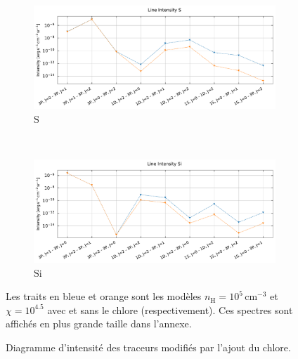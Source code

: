\begin{figure}[!h]
    \begin{subfigure}[t]{0.49\textwidth} %
        \centering \includegraphics[trim = {0 0 0 1cm},clip,width=1\textwidth]{figure/Cl/gridModelEmiss/I_comp_S.pdf}
        \caption{$\mathrm{S}$}
    \end{subfigure}
    ~
    \begin{subfigure}[t]{0.49\textwidth} %
        \centering \includegraphics[trim = {0 0 0 1cm},clip,width=1\textwidth]{figure/Cl/gridModelEmiss/I_comp_Si.pdf}
        \caption{$\mathrm{Si}$}
    \end{subfigure}
    
    \caption{Diagramme d'intensité des traceurs modifiés par l'ajout du chlore.}
    \begin{minipage}{\textwidth}
    Les traits en bleue et orange sont les modèles $n_\mathrm{H}=10^5 \, \mathrm{cm}^{-3}$ et $\chi=10^{4.5}$ avec et sans le chlore (respectivement). Ces spectres sont affichés en plus grande taille dans l'annexe.
    \end{minipage}
    \label{fig:Cl:gridModelEmiss:yes}
\end{figure}





